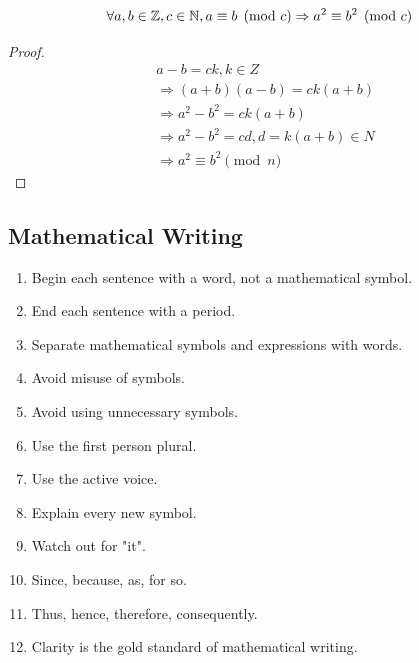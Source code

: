 \begin{proposition}
    \[
        \forall a, b \in \mathbb{Z}, c \in \mathbb{N}, a \equiv b \pmod{c} \Rightarrow a^2 \equiv b^2 \pmod{c}
    \]
\end{proposition}
\begin{proof}
    \begin{align*}
        &a - b = ck, k \in Z \\
        &\Rightarrow (a + b)(a - b) = ck(a + b) \\ 
        &\Rightarrow a^2 - b^2 = ck(a + b) \\
        &\Rightarrow a^2 - b^2 = cd, d = k(a + b) \in N \\
        &\Rightarrow a^2 \equiv b^2 \pmod{n}
    \end{align*}
\end{proof}

\subsection{Mathematical Writing}
\begin{enumerate}
    \item Begin each sentence with a word, not a mathematical symbol. 
    \item End each sentence with a period. 
    \item Separate mathematical symbols and expressions with words. 
    \item Avoid misuse of symbols. 
    \item Avoid using unnecessary symbols. 
    \item Use the first person plural. 
    \item Use the active voice. 
    \item Explain every new symbol. 
    \item Watch out for "it". 
    \item Since, because, as, for so. 
    \item Thus, hence, therefore, consequently. 
    \item Clarity is the gold standard of mathematical writing. 
\end{enumerate}

\newpage